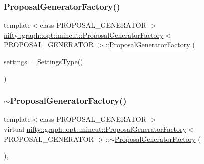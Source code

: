 \subsubsection{\texorpdfstring{Proposal\+Generator\+Factory()}{ProposalGeneratorFactory()}}
{\footnotesize\ttfamily template$<$class P\+R\+O\+P\+O\+S\+A\+L\+\_\+\+G\+E\+N\+E\+R\+A\+T\+OR $>$ \\
\hyperlink{classnifty_1_1graph_1_1opt_1_1mincut_1_1ProposalGeneratorFactory}{nifty\+::graph\+::opt\+::mincut\+::\+Proposal\+Generator\+Factory}$<$ P\+R\+O\+P\+O\+S\+A\+L\+\_\+\+G\+E\+N\+E\+R\+A\+T\+OR $>$\+::\hyperlink{classnifty_1_1graph_1_1opt_1_1mincut_1_1ProposalGeneratorFactory}{Proposal\+Generator\+Factory} (\begin{DoxyParamCaption}\item[{const \hyperlink{classnifty_1_1graph_1_1opt_1_1mincut_1_1ProposalGeneratorFactory_a35b09dd0a76035bdcfe9ecc8ef45e38a}{Settings\+Type} \&}]{settings = {\ttfamily \hyperlink{classnifty_1_1graph_1_1opt_1_1mincut_1_1ProposalGeneratorFactory_a35b09dd0a76035bdcfe9ecc8ef45e38a}{Settings\+Type}()} }\end{DoxyParamCaption})\hspace{0.3cm}{\ttfamily [inline]}}

\mbox{\label{classnifty_1_1graph_1_1opt_1_1mincut_1_1ProposalGeneratorFactory_a0731b4a0eb9b25cae290801a93226e01}} 
\subsubsection{\texorpdfstring{$\sim$\+Proposal\+Generator\+Factory()}{~ProposalGeneratorFactory()}}
{\footnotesize\ttfamily template$<$class P\+R\+O\+P\+O\+S\+A\+L\+\_\+\+G\+E\+N\+E\+R\+A\+T\+OR $>$ \\
virtual \hyperlink{classnifty_1_1graph_1_1opt_1_1mincut_1_1ProposalGeneratorFactory}{nifty\+::graph\+::opt\+::mincut\+::\+Proposal\+Generator\+Factory}$<$ P\+R\+O\+P\+O\+S\+A\+L\+\_\+\+G\+E\+N\+E\+R\+A\+T\+OR $>$\+::$\sim$\hyperlink{classnifty_1_1graph_1_1opt_1_1mincut_1_1ProposalGeneratorFactory}{Proposal\+Generator\+Factory} (\begin{DoxyParamCaption}{ }\end{DoxyParamCaption})\hspace{0.3cm}{\ttfamily [inline]}, {\ttfamily [virtual]}}




